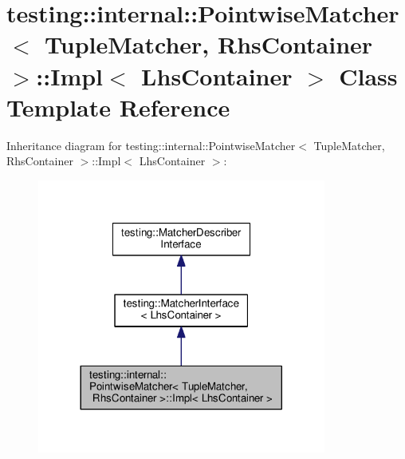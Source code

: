 \hypertarget{classtesting_1_1internal_1_1_pointwise_matcher_1_1_impl}{}\section{testing\+:\+:internal\+:\+:Pointwise\+Matcher$<$ Tuple\+Matcher, Rhs\+Container $>$\+:\+:Impl$<$ Lhs\+Container $>$ Class Template Reference}
\label{classtesting_1_1internal_1_1_pointwise_matcher_1_1_impl}


Inheritance diagram for testing\+:\+:internal\+:\+:Pointwise\+Matcher$<$ Tuple\+Matcher, Rhs\+Container $>$\+:\+:Impl$<$ Lhs\+Container $>$\+:
\nopagebreak
\begin{figure}[H]
\begin{center}
\leavevmode
\includegraphics[width=269pt]{classtesting_1_1internal_1_1_pointwise_matcher_1_1_impl__inherit__graph}
\end{center}
\end{figure}


